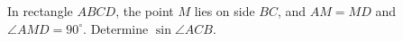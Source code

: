 In rectangle $ABCD$, the point $M$ lies on side $BC$, and $AM=MD$ and $\angle AMD=90^\circ$. Determine $\sin\angle ACB$.
